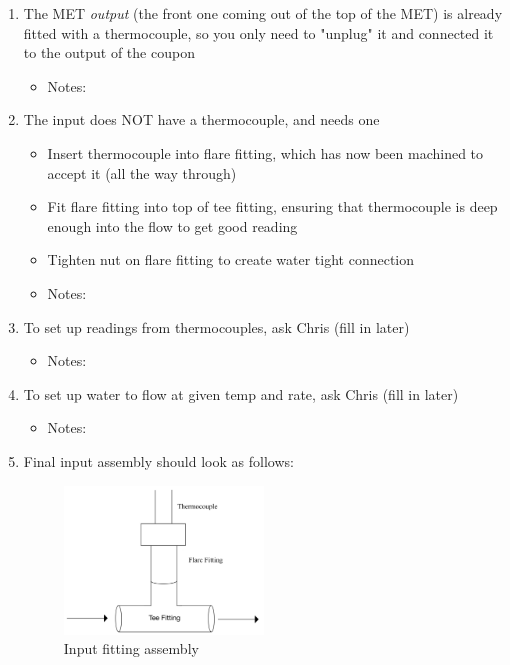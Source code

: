 \documentclass[11pt]{article}
\begin{document}
\begin{enumerate}
            \item The MET \textit{output} (the front one coming out of the top of the MET) is already fitted with a thermocouple, so you only need to "unplug" it and connected it to the output of the coupon
            \begin{itemize}
                \item Notes: 
            \end{itemize}
            \item The input does NOT have a thermocouple, and needs one
            \begin{itemize}
                \item Insert thermocouple into flare fitting, which has now been machined to accept it (all the way through)
                \item Fit flare fitting into top of tee fitting, ensuring that thermocouple is deep enough into the flow to get good reading
                \item Tighten nut on flare fitting to create water tight connection
                \item Notes: 
            \end{itemize}
            \item To set up readings from thermocouples, ask Chris (fill in later)
            \begin{itemize}
                \item Notes: 
            \end{itemize}
            \item To set up water to flow at given temp and rate, ask Chris (fill in later)
            \begin{itemize}
                \item Notes: 
            \end{itemize}
            \item Final input assembly should look as follows: 
            \begin{figure}[h]
                \centering
                \includegraphics[width=0.5\textwidth]{fitting_assembly.jpeg}
                \caption{Input fitting assembly}
            \end{figure}
        \end{enumerate}
\end{document}
